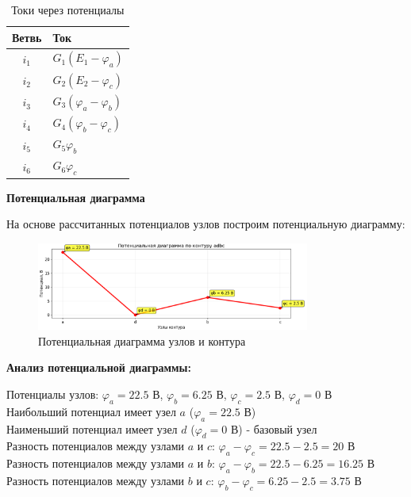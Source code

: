 \begin{table}[H]
\centering
\begin{tabular}{|c|l|}
\hline
\textbf{Ветвь} & \textbf{Ток} \\
\hline
$i_1$ & $G_1(E_1 - \varphi_a)$ \\
\hline
$i_2$ & $G_2(E_2 - \varphi_c)$ \\
\hline
$i_3$ & $G_3(\varphi_a - \varphi_b)$ \\
\hline
$i_4$ & $G_4(\varphi_b - \varphi_c)$ \\
\hline
$i_5$ & $G_5\varphi_b$ \\
\hline
$i_6$ & $G_6\varphi_c$ \\
\hline
\end{tabular}
\caption{Токи через потенциалы}
\label{tab:nodal_current_calculations}
\end{table}

\textbf{Потенциальная диаграмма}

На основе рассчитанных потенциалов узлов построим потенциальную диаграмму:

\begin{figure}[H]
\centering
\includegraphics[width=0.8\textwidth]{images/exanple_potential_diagram.png}
\caption{Потенциальная диаграмма узлов и контура}
\label{fig:potential_diagram}
\end{figure}

\textbf{Анализ потенциальной диаграммы:}
\begin{flushleft}
Потенциалы узлов: $\varphi_a = 22.5$ В, $\varphi_b = 6.25$ В, $\varphi_c = 2.5$ В, $\varphi_d = 0$ В \\
Наибольший потенциал имеет узел $a$ ($\varphi_a = 22.5$ В) \\
Наименьший потенциал имеет узел $d$ ($\varphi_d = 0$ В) - базовый узел \\
Разность потенциалов между узлами $a$ и $c$: $\varphi_a - \varphi_c = 22.5 - 2.5 = 20$ В \\
Разность потенциалов между узлами $a$ и $b$: $\varphi_a - \varphi_b = 22.5 - 6.25 = 16.25$ В \\
Разность потенциалов между узлами $b$ и $c$: $\varphi_b - \varphi_c = 6.25 - 2.5 = 3.75$ В
\end{flushleft}



